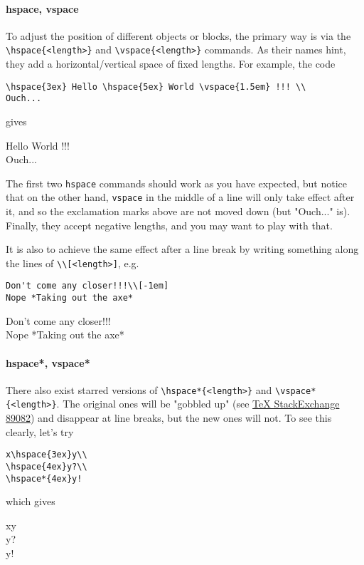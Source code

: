 \paragraph{hspace, vspace}
To adjust the position of different objects or blocks, the primary way is via the \texttt{\textbackslash hspace\{<length>\}} and \texttt{\textbackslash vspace\{<length>\}} commands. As their names hint, they add a horizontal/vertical space of fixed lengths. For example, the code
\begin{lstlisting}
\hspace{3ex} Hello \hspace{5ex} World \vspace{1.5em} !!! \\
Ouch...
\end{lstlisting}
gives \par
\hspace{3ex} Hello \hspace{5ex} World \vspace{1.5em} !!! \\
Ouch...\par
The first two \texttt{\text hspace} commands should work as you have expected, but notice that on the other hand, \texttt{\text vspace} in the middle of a line will only take effect after it, and so the exclamation marks above are not moved down (but "Ouch..." is). Finally, they accept negative lengths, and you may want to play with that.\par

It is also to achieve the same effect after a line break by writing something along the lines of \texttt{\textbackslash\textbackslash [<length>]}, e.g.\
\begin{lstlisting}
Don't come any closer!!!\\[-1em]
Nope *Taking out the axe*
\end{lstlisting}
Don't come any closer!!!\\[-1em]
Nope *Taking out the axe*

\paragraph{hspace*, vspace*}
There also exist starred versions of \texttt{\textbackslash hspace*\{<length>\}} and \texttt{\textbackslash vspace*\{<length>\}}. The original ones will be "gobbled up" (see \href{https://tex.stackexchange.com/questions/89082/hspace-vs-hspace}{{\TeX{} StackExchange 89082}}) and disappear at line breaks, but the new ones will not. To see this clearly, let's try
\begin{lstlisting}
x\hspace{3ex}y\\
\hspace{4ex}y?\\
\hspace*{4ex}y!
\end{lstlisting}
which gives \par
x\hspace{3ex}y\\
\hspace{4ex}y?\\
\hspace*{4ex}y!

